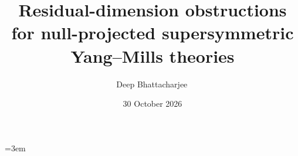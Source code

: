 \documentclass[11pt,a4paper,reqno]{amsart}
\title[Residual-dimension obstructions for null-projected SYM theories]{Residual-dimension obstructions for null-projected supersymmetric Yang--Mills theories}
\author{Deep Bhattacharjee\,\orcidlink{0000-0003-0466-750X}}
\date{30 October 2026}
\numberwithin{equation}{section}
\begin{document}
\begin{abstract}
\itshape

\end{abstract}

\maketitle



\begingroup\sloppy\emergencystretch=3em

\endgroup
\end{document}
